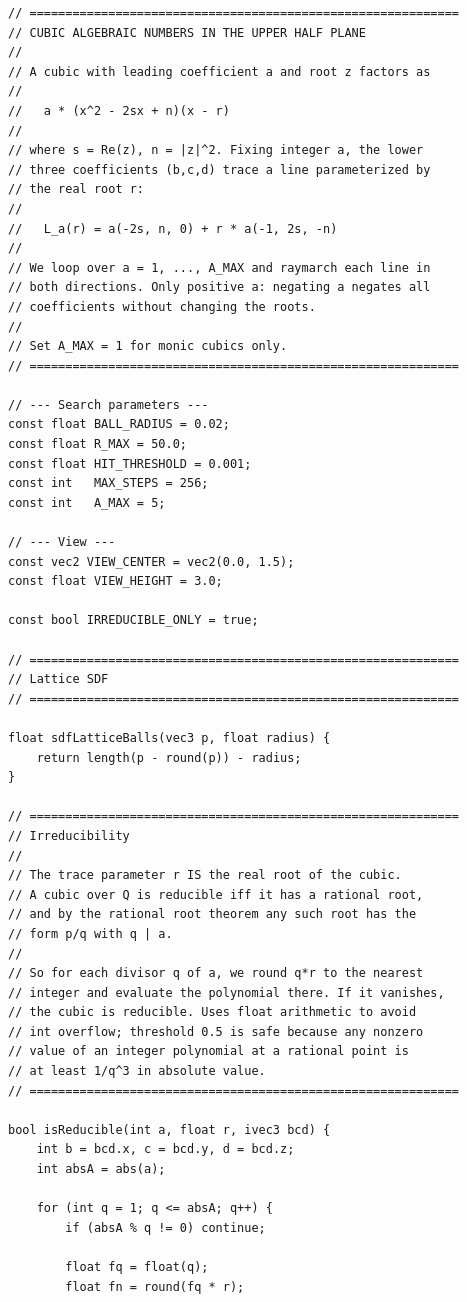\documentclass[11pt]{article}
\begin{document}
\begin{lstlisting}
// ============================================================
// CUBIC ALGEBRAIC NUMBERS IN THE UPPER HALF PLANE
//
// A cubic with leading coefficient a and root z factors as
//
//   a * (x^2 - 2sx + n)(x - r)
//
// where s = Re(z), n = |z|^2. Fixing integer a, the lower
// three coefficients (b,c,d) trace a line parameterized by
// the real root r:
//
//   L_a(r) = a(-2s, n, 0) + r * a(-1, 2s, -n)
//
// We loop over a = 1, ..., A_MAX and raymarch each line in
// both directions. Only positive a: negating a negates all
// coefficients without changing the roots.
//
// Set A_MAX = 1 for monic cubics only.
// ============================================================

// --- Search parameters ---
const float BALL_RADIUS = 0.02;
const float R_MAX = 50.0;
const float HIT_THRESHOLD = 0.001;
const int   MAX_STEPS = 256;
const int   A_MAX = 5;

// --- View ---
const vec2 VIEW_CENTER = vec2(0.0, 1.5);
const float VIEW_HEIGHT = 3.0;

const bool IRREDUCIBLE_ONLY = true;

// ============================================================
// Lattice SDF
// ============================================================

float sdfLatticeBalls(vec3 p, float radius) {
    return length(p - round(p)) - radius;
}

// ============================================================
// Irreducibility
//
// The trace parameter r IS the real root of the cubic.
// A cubic over Q is reducible iff it has a rational root,
// and by the rational root theorem any such root has the
// form p/q with q | a.
//
// So for each divisor q of a, we round q*r to the nearest
// integer and evaluate the polynomial there. If it vanishes,
// the cubic is reducible. Uses float arithmetic to avoid
// int overflow; threshold 0.5 is safe because any nonzero
// value of an integer polynomial at a rational point is
// at least 1/q^3 in absolute value.
// ============================================================

bool isReducible(int a, float r, ivec3 bcd) {
    int b = bcd.x, c = bcd.y, d = bcd.z;
    int absA = abs(a);

    for (int q = 1; q <= absA; q++) {
        if (absA % q != 0) continue;

        float fq = float(q);
        float fn = round(fq * r);


\end{lstlisting}
\end{document}
